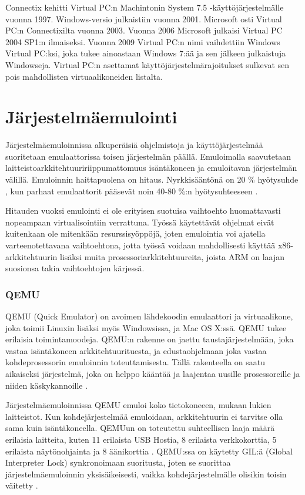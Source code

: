 Connectix kehitti Virtual PC:n Machintonin System 7.5 -käyttöjärjestelmälle vuonna 1997. Windows-versio julkaistiin vuonna 2001. Microsoft osti Virtual PC:n Connectixilta vuonna 2003. Vuonna 2006 Microsoft julkaisi Virtual PC 2004 SP1:n ilmaiseksi. Vuonna 2009 Virtual PC:n nimi vaihdettiin Windows Virtual PC:ksi, joka tukee ainoastaan Windows 7:ää ja sen jälkeen julkaistuja Windowseja. Virtual PC:n asettamat käyttöjärjestelmärajoitukset sulkevat sen pois mahdollisten virtuaalikoneiden listalta.


\section{Järjestelmäemulointi}
Järjestelmäemuloinnissa alkuperäisiä ohjelmistoja ja käyttöjärjestelmää suoritetaan emulaattorissa toisen järjestelmän päällä. Emuloimalla saavutetaan laitteistoarkkitehtuuririippumattomuus isäntäkoneen ja emuloitavan järjestelmän välillä. Emuloinnin haittapuolena on hitaus. Nyrkkisääntönä on 20 \% hyötysuhde \cite{tinycc}, kun parhaat emulaattorit pääsevät noin 40-80 \%:n hyötysuhteeseen \cite{40pperf}.

Hitauden vuoksi emulointi ei ole erityisen suotuisa vaihtoehto huomattavasti nopeampaan virtualisointiin verrattuna. Työssä käytettävät ohjelmat eivät kuitenkaan ole mitenkään resurssisyöppöjä, joten emulointia voi ajatella varteenotettavana vaihtoehtona, jotta työssä voidaan mahdollisesti käyttää x86-arkkitehtuurin lisäksi muita prosessoriarkkitehtuureita, joista ARM on laajan suosionsa takia vaihtoehtojen kärjessä.

\subsubsection{QEMU}
QEMU (Quick Emulator) on avoimen lähdekoodin emulaattori ja virtuaalikone, joka toimii Linuxin lisäksi myös Windowsissa, ja Mac OS X:ssä. QEMU tukee erilaisia toimintamoodeja. QEMU:n rakenne on jaettu taustajärjestelmään, joka vastaa isäntäkoneen arkkitehtuurituesta, ja edustaohjelmaan joka vastaa kohdeprosessorin emuloinnin toteuttamisesta. Tällä rakenteella on saatu aikaiseksi järjestelmä, joka on helppo kääntää ja laajentaa uusille prosessoreille ja niiden käskykannoille \cite{qemu_doc}.

Järjestelmäemuloinnissa QEMU emuloi koko tietokoneeen, mukaan lukien laitteistot. Kun kohdejärjestelmää emuloidaan, arkkitehtuurin ei tarvitse olla sama kuin isäntäkoneella. QEMUun on toteutettu suhteellisen laaja määrä erilaisia laitteita, kuten 11 erilaista USB Hostia, 8 erilaista verkkokorttia, 5 erilaista näytönohjainta ja 8 äänikorttia \cite{qemu_doc}. QEMU:ssa on käytetty GIL:ä (Global Interpreter Lock) synkronoimaan suoritusta, joten se suorittaa järjestelmäemuloinnin yksisäikeisesti, vaikka kohdejärjestelmälle olisikin toisin väitetty \cite{qemu_tech}.


